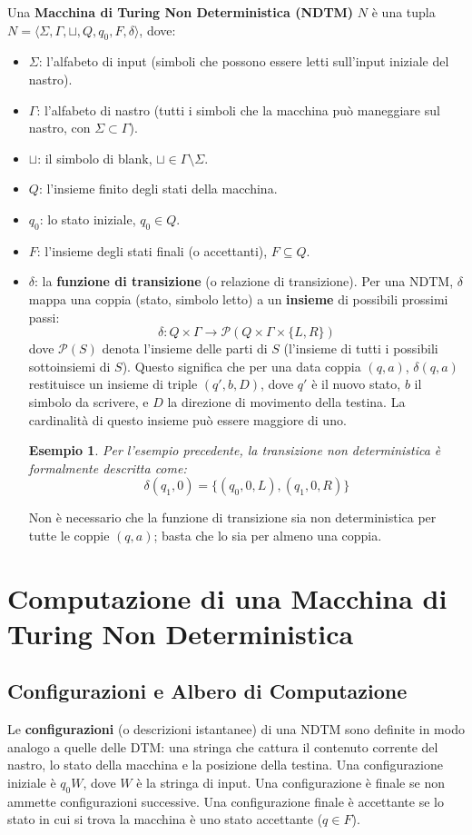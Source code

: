 \documentclass[a4paper]{article}
\newtheorem{example}{Esempio}
\begin{document}
Una \textbf{Macchina di Turing Non Deterministica (NDTM)} $N$ è una tupla $N = \langle \Sigma, \Gamma, \sqcup, Q, q_0, F, \delta \rangle$, dove:
\begin{itemize}
    \item $\Sigma$: l'alfabeto di input (simboli che possono essere letti sull'input iniziale del nastro).
    \item $\Gamma$: l'alfabeto di nastro (tutti i simboli che la macchina può maneggiare sul nastro, con $\Sigma \subset \Gamma$).
    \item $\sqcup$: il simbolo di blank, $\sqcup \in \Gamma \setminus \Sigma$.
    \item $Q$: l'insieme finito degli stati della macchina.
    \item $q_0$: lo stato iniziale, $q_0 \in Q$.
    \item $F$: l'insieme degli stati finali (o accettanti), $F \subseteq Q$.
    \item $\delta$: la \textbf{funzione di transizione} (o relazione di transizione). Per una NDTM, $\delta$ mappa una coppia (stato, simbolo letto) a un \textbf{insieme} di possibili prossimi passi:
    \[ \delta: Q \times \Gamma \to \mathcal{P}(Q \times \Gamma \times \{L, R\}) \]
    dove $\mathcal{P}(S)$ denota l'insieme delle parti di $S$ (l'insieme di tutti i possibili sottoinsiemi di $S$). Questo significa che per una data coppia $(q, a)$, $\delta(q, a)$ restituisce un insieme di triple $(q', b, D)$, dove $q'$ è il nuovo stato, $b$ il simbolo da scrivere, e $D$ la direzione di movimento della testina. La cardinalità di questo insieme può essere maggiore di uno.

    \begin{example}
    Per l'esempio precedente, la transizione non deterministica è formalmente descritta come:
    \[ \delta(q_1, 0) = \{ (q_0, 0, L), (q_1, 0, R) \} \]
    \end{example}
    Non è necessario che la funzione di transizione sia non deterministica per tutte le coppie $(q,a)$; basta che lo sia per almeno una coppia.
\end{itemize}

\section{Computazione di una Macchina di Turing Non Deterministica}

\subsection{Configurazioni e Albero di Computazione}
Le \textbf{configurazioni} (o descrizioni istantanee) di una NDTM sono definite in modo analogo a quelle delle DTM: una stringa che cattura il contenuto corrente del nastro, lo stato della macchina e la posizione della testina.
Una configurazione iniziale è $q_0W$, dove $W$ è la stringa di input.
Una configurazione è finale se non ammette configurazioni successive. Una configurazione finale è accettante se lo stato in cui si trova la macchina è uno stato accettante ($q \in F$).
\end{document}
